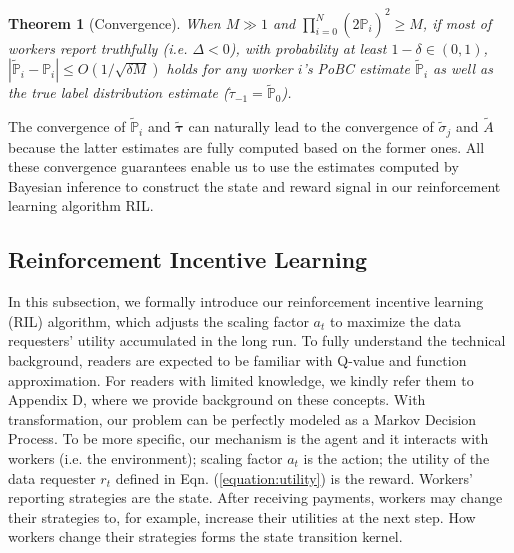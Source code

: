 \documentclass{article}
\newtheorem{theorem}{Theorem}
\begin{document}
\begin{theorem}[Convergence]
\label{label:convergence}
When $M\gg 1$ and ${\prod}_{i=0}^{N}(2\hat{\mathbb{P}}_{i})^{2} \geq M$, if most of workers report truthfully (i.e. $\Delta<0$), with probability at least $1-\delta\in (0,1)$, $|\tilde{\mathbb{P}}_i-\mathbb{P}_i|\leq O(1/\sqrt{\delta M})$ holds for any worker $i$'s PoBC estimate $\tilde{\mathbb{P}}_i$ as well as the true label distribution estimate ($\tilde{\tau}_{-1}=\tilde{\mathbb{P}}_0$).
\end{theorem}
The convergence of $\tilde{\mathbb{P}}_i$ and $\tilde{\bm{\tau}}$ can naturally lead to the convergence of $\tilde{\sigma}_j$ and $\tilde{A}$ because the latter estimates are fully computed based on the former ones. 
All these convergence guarantees enable us to use the estimates computed by Bayesian inference to construct the state and reward signal in our reinforcement learning algorithm RIL.

\subsection{Reinforcement Incentive Learning}
\label{RL}
In this subsection, we formally introduce our reinforcement incentive learning (RIL) algorithm, which adjusts the scaling factor $a_t$ to maximize the data requesters' utility accumulated in the long run.
To fully understand the technical background, readers are expected to be familiar with Q-value and function approximation.
For readers with limited knowledge, we kindly refer them to Appendix D, where we provide background on these concepts.
With transformation, our problem can be perfectly modeled as a Markov Decision Process.
To be more specific, our mechanism is the agent and it interacts with workers (i.e. the environment); scaling factor $a_t$ is the action; the utility of the data requester $r_t$ defined in Eqn. (\ref{equation:utility}) is the reward.
Workers' reporting strategies are the state.
After receiving payments, workers may change their strategies to, for example, increase their utilities at the next step.
How workers change their strategies forms the state transition kernel.
\end{document}
